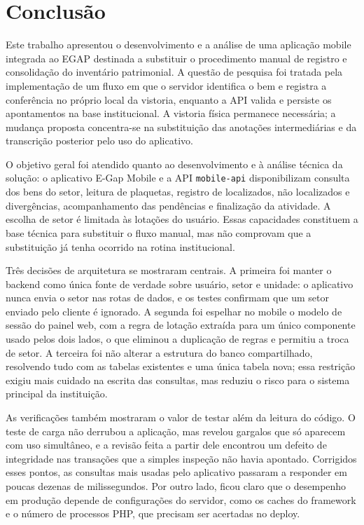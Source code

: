 \documentclass[12pt,a4paper]{article}
\begin{document}
\section{Conclusão}

Este trabalho apresentou o desenvolvimento e a análise de uma aplicação mobile integrada ao EGAP destinada a substituir o procedimento manual de registro e consolidação do inventário patrimonial. A questão de pesquisa foi tratada pela implementação de um fluxo em que o servidor identifica o bem e registra a conferência no próprio local da vistoria, enquanto a API valida e persiste os apontamentos na base institucional. A vistoria física permanece necessária; a mudança proposta concentra-se na substituição das anotações intermediárias e da transcrição posterior pelo uso do aplicativo.

O objetivo geral foi atendido quanto ao desenvolvimento e à análise técnica da solução: o aplicativo E-Gap Mobile e a API \texttt{mobile-api} disponibilizam consulta dos bens do setor, leitura de plaquetas, registro de localizados, não localizados e divergências, acompanhamento das pendências e finalização da atividade. A escolha de setor é limitada às lotações do usuário. Essas capacidades constituem a base técnica para substituir o fluxo manual, mas não comprovam que a substituição já tenha ocorrido na rotina institucional.

Três decisões de arquitetura se mostraram centrais. A primeira foi manter o backend como única fonte de verdade sobre usuário, setor e unidade: o aplicativo nunca envia o setor nas rotas de dados, e os testes confirmam que um setor enviado pelo cliente é ignorado. A segunda foi espelhar no mobile o modelo de sessão do painel web, com a regra de lotação extraída para um único componente usado pelos dois lados, o que eliminou a duplicação de regras e permitiu a troca de setor. A terceira foi não alterar a estrutura do banco compartilhado, resolvendo tudo com as tabelas existentes e uma única tabela nova; essa restrição exigiu mais cuidado na escrita das consultas, mas reduziu o risco para o sistema principal da instituição.

As verificações também mostraram o valor de testar além da leitura do código. O teste de carga não derrubou a aplicação, mas revelou gargalos que só aparecem com uso simultâneo, e a revisão feita a partir dele encontrou um defeito de integridade nas transações que a simples inspeção não havia apontado. Corrigidos esses pontos, as consultas mais usadas pelo aplicativo passaram a responder em poucas dezenas de milissegundos. Por outro lado, ficou claro que o desempenho em produção depende de configurações do servidor, como os caches do framework e o número de processos PHP, que precisam ser acertadas no deploy.
\end{document}
